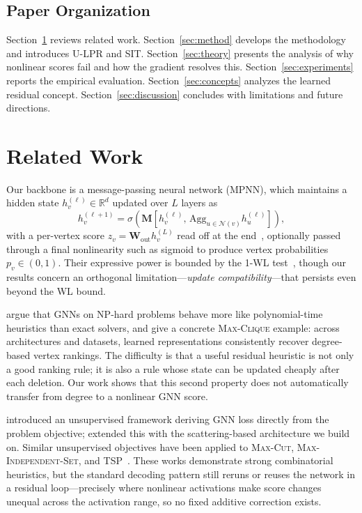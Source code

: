 \documentclass[journal,article,submit,pdftex,moreauthors]{Definitions/mdpi}
\begin{document}
\subsection{Paper Organization}

Section~\ref{sec:related} reviews related work. Section~\ref{sec:method} develops
the methodology and introduces U-LPR and SIT. Section~\ref{sec:theory} presents
the analysis of why nonlinear scores fail and how the gradient resolves this.
Section~\ref{sec:experiments} reports the empirical evaluation.
Section~\ref{sec:concepts} analyzes the learned residual concept.
Section~\ref{sec:discussion} concludes with limitations and future directions.

\section{Related Work}
\label{sec:related}

Our backbone is a message-passing neural network (MPNN), which maintains a hidden
state $h_v^{(\ell)} \in \mathbb{R}^d$ updated over $L$ layers as
\[
  h_v^{(\ell+1)}
  =
  \sigma\!\left(
    \mathbf{M}\!\left[
      h_v^{(\ell)},\,
      \mathrm{Agg}_{u\in\mathcal{N}(v)} h_u^{(\ell)}
    \right]
  \right),
\]
with a per-vertex score $z_v = \mathbf{W}_{\mathrm{out}} h_v^{(L)}$ read off at the
end~\citep{xu2019}, optionally passed through a final nonlinearity such as sigmoid
to produce vertex probabilities $p_v \in (0,1)$. Their expressive power is bounded
by the 1-WL test~\citep{xu2019,morris2019}, though our results concern an orthogonal
limitation---\emph{update compatibility}---that persists even beyond the WL bound.


\citet{cappart2023} argue that GNNs on NP-hard problems behave more like
polynomial-time heuristics than exact solvers, and \citet{shoham2026ltr} give a
concrete \textsc{Max-Clique} example: across architectures and datasets, learned
representations consistently recover degree-based vertex rankings. The difficulty is
that a useful residual heuristic is not only a good ranking rule; it is also a rule
whose state can be updated cheaply after each deletion. Our work shows that this
second property does not automatically transfer from degree to a nonlinear GNN score.


\citet{karalias2020} introduced an unsupervised framework deriving GNN loss directly
from the problem objective; \citet{min2022} extended this with the scattering-based
architecture we build on. Similar unsupervised objectives have been applied to
\textsc{Max-Cut}, \textsc{Max-Independent-Set}, and
\textsc{TSP}~\citep{schuetz2022,garmendia2024}. These works demonstrate strong
combinatorial heuristics, but the standard decoding pattern still reruns or reuses
the network in a residual loop---precisely where nonlinear activations make score
changes unequal across the activation range, so no fixed additive correction exists.
\end{document}
